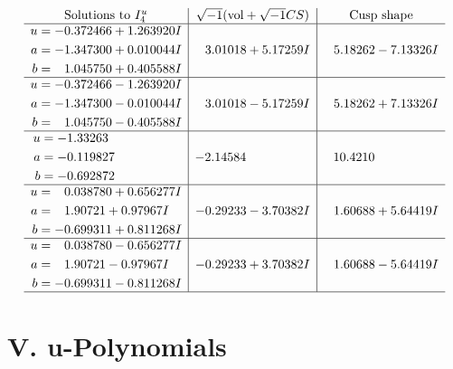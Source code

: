 \documentclass[1p]{elsarticle_modified}
\theoremstyle{definition}
\newcommand{\I}{\sqrt{-1}}
\begin{document}
$$\begin{array}{c|c|c}  
\text{Solutions to }I^u_{4}& \I (\text{vol} + \sqrt{-1}CS) & \text{Cusp shape}\\
 \hline 
\begin{aligned}
u &= -0.372466 + 1.263920 I \\
a &= -1.347300 + 0.010044 I \\
b &= \phantom{-}1.045750 + 0.405588 I\end{aligned}
 & \phantom{-}3.01018 + 5.17259 I & \phantom{-}5.18262 - 7.13326 I \\ \hline\begin{aligned}
u &= -0.372466 - 1.263920 I \\
a &= -1.347300 - 0.010044 I \\
b &= \phantom{-}1.045750 - 0.405588 I\end{aligned}
 & \phantom{-}3.01018 - 5.17259 I & \phantom{-}5.18262 + 7.13326 I \\ \hline\begin{aligned}
u &= -1.33263\phantom{ +0.000000I} \\
a &= -0.119827\phantom{ +0.000000I} \\
b &= -0.692872\phantom{ +0.000000I}\end{aligned}
 & -2.14584\phantom{ +0.000000I} & \phantom{-}10.4210\phantom{ +0.000000I} \\ \hline\begin{aligned}
u &= \phantom{-}0.038780 + 0.656277 I \\
a &= \phantom{-}1.90721 + 0.97967 I \\
b &= -0.699311 + 0.811268 I\end{aligned}
 & -0.29233 - 3.70382 I & \phantom{-}1.60688 + 5.64419 I \\ \hline\begin{aligned}
u &= \phantom{-}0.038780 - 0.656277 I \\
a &= \phantom{-}1.90721 - 0.97967 I \\
b &= -0.699311 - 0.811268 I\end{aligned}
 & -0.29233 + 3.70382 I & \phantom{-}1.60688 - 5.64419 I\\
 \hline 
 \end{array}$$\newpage
\newpage\renewcommand{\arraystretch}{1}
\centering \section*{ V. u-Polynomials}
\end{document}
